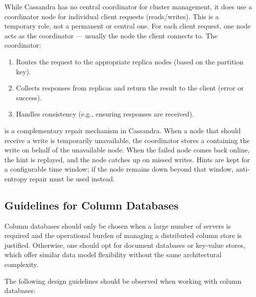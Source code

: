 While Cassandra has no central coordinator for cluster management, it does use a coordinator node for individual client requests (reads/writes). This is a temporary role, not a permanent or central one.
For each client request, one node acts as the coordinator --- usually the node the client connects to.
The coordinator:
\begin{enumerate}
    \item Routes the request to the appropriate replica nodes (based on the partition key).
    \item Collects responses from replicas and return the result to the client (error or success).
    \item Handles consistency (e.g., ensuring  responses are received).
\end{enumerate}

 is a complementary repair mechanism in Cassandra. When a node that should receive a write is temporarily unavailable, the coordinator stores a  containing the write on behalf of the unavailable node. When the failed node comes back online, the hint is replayed, and the node catches up on missed writes. Hints are kept for a configurable time window; if the node remains down beyond that window, anti-entropy repair must be used instead.

\subsection{Guidelines for Column Databases}

Column databases should only be chosen when a large number of servers is required and the operational burden of managing a distributed column store is justified. Otherwise, one should opt for document databases or key-value stores, which offer similar data model flexibility without the same architectural complexity.

The following design guidelines should be observed when working with column databases:

